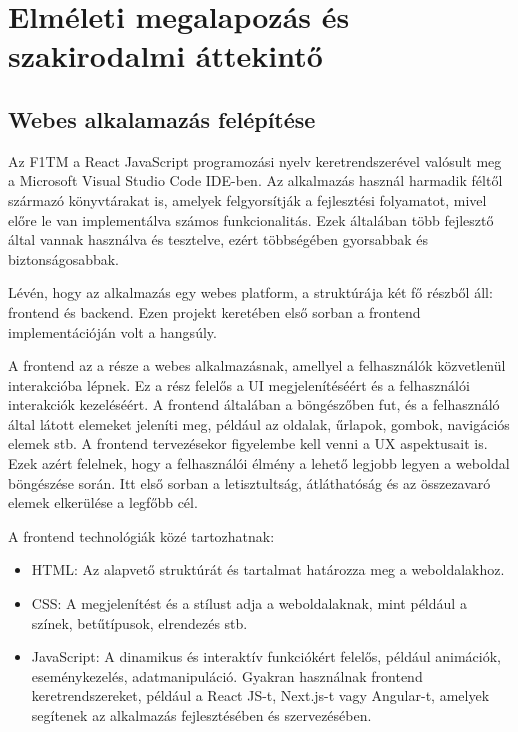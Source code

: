 \chapter{Elméleti megalapozás és szakirodalmi áttekintő}

\section {Webes alkalamazás felépítése}

Az F1TM a React JavaScript programozási nyelv keretrendszerével valósult meg a Microsoft Visual Studio Code IDE-ben. Az alkalmazás használ harmadik féltől származó könyvtárakat is, amelyek felgyorsítják a fejlesztési folyamatot, mivel előre le van implementálva számos funkcionalitás. Ezek általában több fejlesztő által vannak használva és tesztelve, ezért többségében gyorsabbak és biztonságosabbak.

Lévén, hogy az alkalmazás egy webes platform, a struktúrája két fő részből áll: frontend és backend. Ezen projekt keretében első sorban a frontend implementációján volt a hangsúly.

A frontend az a része a webes alkalmazásnak, amellyel a felhasználók közvetlenül interakcióba lépnek. Ez a rész felelős a UI megjelenítéséért és a felhasználói interakciók kezeléséért. A frontend általában a böngészőben fut, és a felhasználó által látott elemeket jeleníti meg, például az oldalak, űrlapok, gombok, navigációs elemek stb. A frontend tervezésekor figyelembe kell venni a UX aspektusait is. Ezek azért felelnek, hogy a felhasználói élmény a lehető legjobb legyen a weboldal böngészése során. Itt első sorban a letisztultság, átláthatóság és az összezavaró elemek elkerülése a legfőbb cél.

A frontend technológiák közé tartozhatnak:
\begin{itemize}
	\item HTML: Az alapvető struktúrát és tartalmat határozza meg a weboldalakhoz.
	\item CSS: A megjelenítést és a stílust adja a weboldalaknak, mint például a színek, betűtípusok, elrendezés stb.
	\item JavaScript: A dinamikus és interaktív funkciókért felelős, például animációk, eseménykezelés, adatmanipuláció. Gyakran használnak frontend keretrendszereket, például a React JS-t, Next.js-t vagy Angular-t, amelyek segítenek az alkalmazás fejlesztésében és szervezésében. 
\end{itemize}

